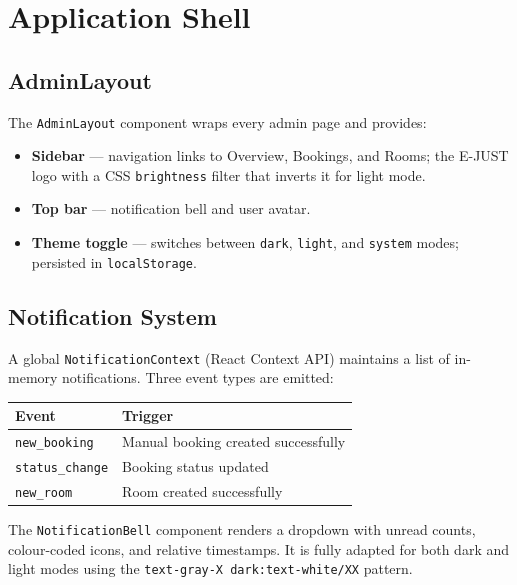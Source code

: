 \documentclass[12pt,a4paper]{report}
\begin{document}
\section{Application Shell}

\subsection{AdminLayout}

The \texttt{AdminLayout} component wraps every admin page and provides:

\begin{itemize}[leftmargin=2em]
  \item \textbf{Sidebar} — navigation links to Overview, Bookings, and Rooms;
        the E-JUST logo with a CSS \texttt{brightness} filter that inverts it
        for light mode.
  \item \textbf{Top bar} — notification bell and user avatar.
  \item \textbf{Theme toggle} — switches between \texttt{dark}, \texttt{light},
        and \texttt{system} modes; persisted in \texttt{localStorage}.
\end{itemize}

\subsection{Notification System}

A global \texttt{NotificationContext} (React Context API) maintains a list of
in-memory notifications. Three event types are emitted:

\begin{center}
\begin{tabular}{ll}
  \toprule
  \textbf{Event} & \textbf{Trigger} \\
  \midrule
  \texttt{new\_booking}   & Manual booking created successfully \\
  \texttt{status\_change} & Booking status updated \\
  \texttt{new\_room}      & Room created successfully \\
  \bottomrule
\end{tabular}
\end{center}

The \texttt{NotificationBell} component renders a dropdown with unread counts,
colour-coded icons, and relative timestamps. It is fully adapted for both
dark and light modes using the \texttt{text-gray-X dark:text-white/XX} pattern.
\end{document}
